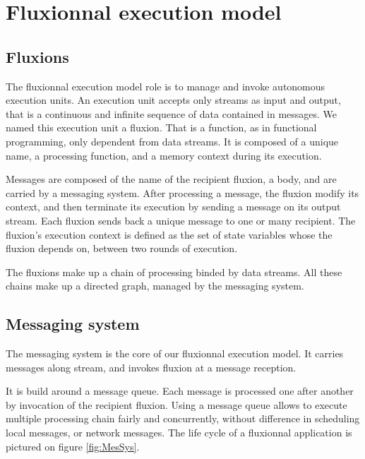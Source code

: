 \section{Fluxionnal execution model}

\subsection{Fluxions}

The fluxionnal execution model role is to manage and invoke autonomous execution units.
An execution unit accepts only streams as input and output, that is a continuous and infinite sequence of data contained in messages.
We named this execution unit a fluxion.
That is a function, as in functional programming, only dependent from data streams.
It is composed of a unique name, a processing function, and a memory context during its execution.

Messages are composed of the name of the recipient fluxion, a body, and are carried by a messaging system.
After processing a message, the fluxion modify its context, and then terminate its execution by sending a message on its output stream.
Each fluxion sends back a unique message to one or many recipient.
The fluxion's execution context is defined as the set of state variables whose the fluxion depends on, between two rounds of execution.

The fluxions make up a chain of processing binded by data streams.
All these chains make up a directed graph, managed by the messaging system.

\subsection{Messaging system}

The messaging system is the core of our fluxionnal execution model.
It carries messages along stream, and invokes fluxion at a message reception.

It is build around a message queue.
Each message is processed one after another by invocation of the recipient fluxion.
Using a message queue allows to execute multiple processing chain fairly and concurrently, without difference in scheduling local messages, or network messages.
The life cycle of a fluxionnal application is pictured on figure \ref{fig:MesSys}.


